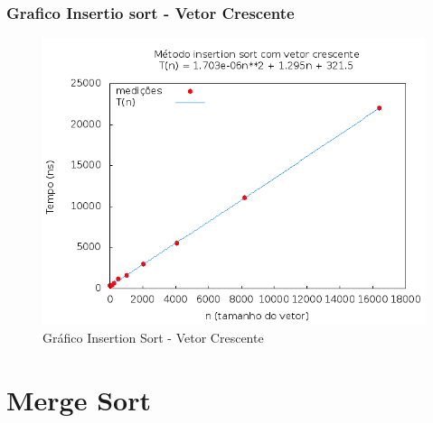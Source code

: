 \documentclass[12pt,a4paper,twoside]{report}
\begin{document}
\subsection{Grafico Insertio sort - Vetor Crescente}
\begin{figure}[H]
    \centering
    \includegraphics[width=0.7\linewidth]{graficos/Insertion/vIntCrescente/vIntCrescente.png}
  \caption{Gráfico Insertion Sort - Vetor Crescente}
\end{figure}
\chapter{Merge Sort}

%
%

%  
\end{document}
